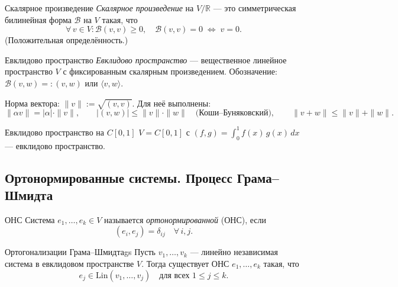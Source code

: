 \begin{Definition}{Скалярное произведение}{}
	\textit{Скалярное произведение} на $V/\mathbb{R}$ — это симметрическая билинейная форма $\mathcal{B}$ на $V$ такая, что
	\[
	\forall\, v \in V\colon \mathcal{B}(v,v) \geq 0, \quad \mathcal{B}(v,v) = 0 \;\Longleftrightarrow\; v = 0.
	\]
	(Положительная определённость.)
\end{Definition}

\begin{Definition}{Евклидово пространство}{}
	\textit{Евклидово пространство} — вещественное линейное пространство $V$ с фиксированным скалярным произведением. Обозначение: $\mathcal{B}(v, w) =: (v, w)$ или $\langle v, w \rangle$.
\end{Definition}

Норма вектора: $\|v\| := \sqrt{(v,v)}$. Для неё выполнены:
\[
\|\alpha v\| = |\alpha|\cdot\|v\|, \qquad
|(v,w)| \leq \|v\|\cdot\|w\| \quad \text{(Коши--Буняковский)}, \qquad
\|v+w\| \leq \|v\| + \|w\|.
\]

\begin{Example}{Евклидово пространство на $C[0,1]$}{}
	$V = C[0,1]$ с $(f,g) = \displaystyle\int_0^1 f(x)\,g(x)\,dx$ — евклидово пространство.
\end{Example}

\subsection{Ортонормированные системы. Процесс Грама–Шмидта}

\begin{Definition}{ОНС}{}
	Система $e_1,\ldots,e_k \in V$ называется \textit{ортонормированной} (ОНС), если
	\[
	(e_i, e_j) = \delta_{ij} \quad \forall\, i, j.
	\]
\end{Definition}

\begin{Theorem}{Ортогонализации Грама–Шмидта}{gs}
	Пусть $v_1,\ldots,v_k$ — линейно независимая система в евклидовом пространстве $V$.
	Тогда существует ОНС $e_1,\ldots,e_k$ такая, что
	\[
	e_j \in \mathrm{Lin}(v_1,\ldots,v_j) \quad \text{для всех } 1 \leq j \leq k.
	\]
\end{Theorem}